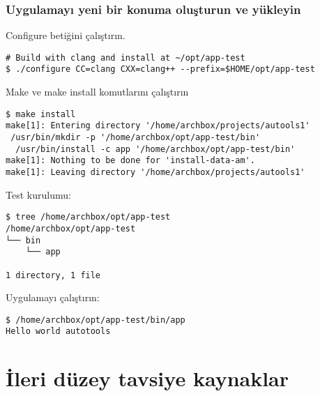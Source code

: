 \documentclass[
]{book}
\begin{document}
\hypertarget{uygulamayux131-yeni-bir-konuma-oluux15fturun-ve-yuxfckleyin}{%
\subsubsection{Uygulamayı yeni bir konuma oluşturun ve yükleyin}\label{uygulamayux131-yeni-bir-konuma-oluux15fturun-ve-yuxfckleyin}}

Configure betiğini çalıştırın.

\begin{verbatim}
# Build with clang and install at ~/opt/app-test 
$ ./configure CC=clang CXX=clang++ --prefix=$HOME/opt/app-test
\end{verbatim}

Make ve make install komutlarını çalıştırın

\begin{verbatim}
$ make install
make[1]: Entering directory '/home/archbox/projects/autools1'
 /usr/bin/mkdir -p '/home/archbox/opt/app-test/bin'
  /usr/bin/install -c app '/home/archbox/opt/app-test/bin'
make[1]: Nothing to be done for 'install-data-am'.
make[1]: Leaving directory '/home/archbox/projects/autools1'
\end{verbatim}

Test kurulumu:

\begin{verbatim}
$ tree /home/archbox/opt/app-test
/home/archbox/opt/app-test
└── bin
    └── app

1 directory, 1 file
\end{verbatim}

Uygulamayı çalıştırın:

\begin{verbatim}
$ /home/archbox/opt/app-test/bin/app 
Hello world autotools
\end{verbatim}

\hypertarget{ileri-duxfczey-tavsiye-kaynaklar}{%
\section{İleri düzey tavsiye kaynaklar}\label{ileri-duxfczey-tavsiye-kaynaklar}}
\end{document}
